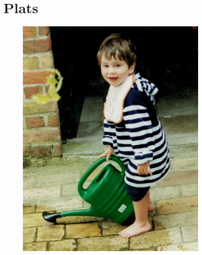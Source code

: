 \documentclass{C:/Users/Simon/Desktop/mamette/cuisine/recipe}
\begin{document}
\chapter{Plats}
\begin{figure}[h]
\centering
\includegraphics[width=0.85\textwidth]{images/chapter2.jpg}
\end{figure}

\end{document}
